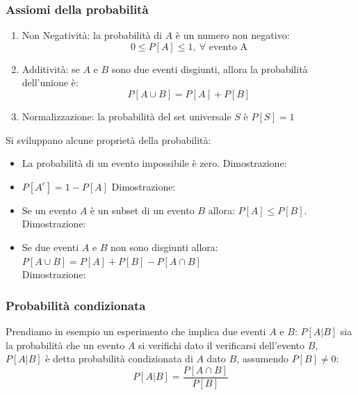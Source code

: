         \subsubsection{Assiomi della probabilità}
            \begin{enumerate}
                \item \label{Ass. Prob. 1}{Non Negatività: la probabilità di $A$ è un numero non negativo:
                    \[
                        0\leq P[A] \leq 1,\ \forall \text{ evento A}
                    \]
                }
                \item \label{Ass. Prob. 2}{Additività: se $A$ e $B$ sono due eventi disgiunti, allora la probabilità dell'unione è: 
                    \[
                        P[A\cup B] = P[A] + P[B] 
                    \]
                }
                \item \label{Ass. Prob. 3}{Normalizzazione: la probabilità del set universale $S$ è $P[S] = 1$}
            \end{enumerate}
            Si sviluppano alcune proprietà della probabilità:
            \begin{itemize}
                \item {
                    La probabilità di un evento impossibile è zero.
                    Dimostrazione:
                }
                \item {
                    $P[A^c] = 1-P[A]$
                    Dimostrazione:
                }
                \item {
                    Se un evento $A$ è un subset di un evento $B$ allora: $P[A]\leq P[B]$. 
                    Dimostrazione: 
                }
                \item {
                    \begin{sloppypar}
                        Se due eventi $A$ e $B$ non sono disgiunti allora: ${P[A \cup B]= P[A] + P[B] -  P[A\cap B]}$\\
                        Dimostrazione:
                    \end{sloppypar}
                }
            \end{itemize}
        \subsubsection{Probabilità condizionata}\label{Probabilità condizionata}
            Prendiamo in esempio un esperimento che implica due eventi $A$ e $B$: $P[A|B]$ sia la probabilità che un evento $A$ si verifichi
            dato il verificarsi dell'evento $B$, $P[A|B]$ è detta probabilità condizionata di $A$ dato $B$, assumendo $P[B]\neq 0$:
            \[
                P[A|B] = \frac{P[A\cap B]}{P[B]}
            \]

